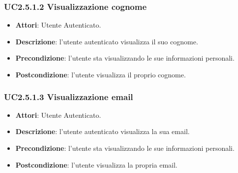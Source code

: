 \subsubsection{UC2.5.1.2 Visualizzazione cognome}
\begin{itemize}
\item \textbf{Attori}: Utente Autenticato.
\item \textbf{Descrizione}: l'utente autenticato visualizza il suo cognome.
\item \textbf{Precondizione}: l'utente sta visualizzando le sue informazioni personali.
\item \textbf{Postcondizione}: l'utente visualizza il proprio cognome.
\end{itemize}
\subsubsection{UC2.5.1.3 Visualizzazione email}
\begin{itemize}
\item \textbf{Attori}: Utente Autenticato.
\item \textbf{Descrizione}: l'utente autenticato visualizza la sua email.
\item \textbf{Precondizione}: l'utente sta visualizzando le sue informazioni personali.
\item \textbf{Postcondizione}: l'utente visualizza la propria email.
\end{itemize}
